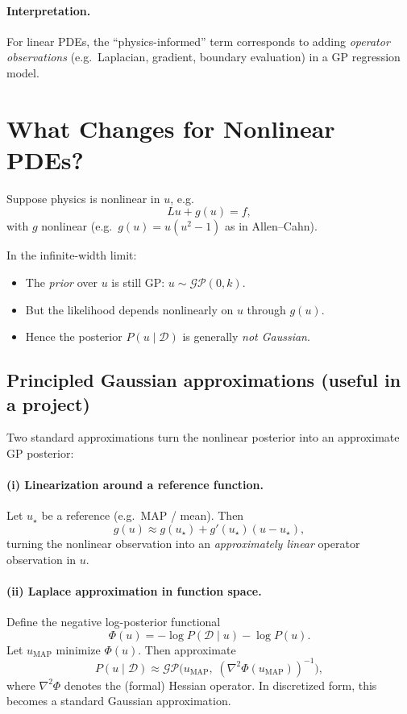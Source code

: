 \documentclass[11pt]{article}
\begin{document}
\paragraph{Interpretation.}
For linear PDEs, the ``physics-informed'' term corresponds to adding \emph{operator observations} (e.g.\ Laplacian,
gradient, boundary evaluation) in a GP regression model.

\section{What Changes for Nonlinear PDEs?}

Suppose physics is nonlinear in $u$, e.g.
\begin{equation}
Lu + g(u) = f,
\end{equation}
with $g$ nonlinear (e.g.\ $g(u)=u(u^2-1)$ as in Allen--Cahn).

In the infinite-width limit:
\begin{itemize}
\item The \emph{prior} over $u$ is still GP: $u\sim \mathcal{GP}(0,k)$.
\item But the likelihood depends nonlinearly on $u$ through $g(u)$.
\item Hence the posterior $P(u\mid \mathcal D)$ is generally \emph{not Gaussian}.
\end{itemize}

\subsection{Principled Gaussian approximations (useful in a project)}

Two standard approximations turn the nonlinear posterior into an approximate GP posterior:

\paragraph{(i) Linearization around a reference function.}
Let $u_\star$ be a reference (e.g.\ MAP / mean). Then
\begin{equation}
g(u)\approx g(u_\star) + g'(u_\star)(u-u_\star),
\end{equation}
turning the nonlinear observation into an \emph{approximately linear} operator observation in $u$.

\paragraph{(ii) Laplace approximation in function space.}
Define the negative log-posterior functional
\begin{equation}
\Phi(u) = -\log P(\mathcal D\mid u) - \log P(u).
\end{equation}
Let $u_{\text{MAP}}$ minimize $\Phi(u)$. Then approximate
\begin{equation}
P(u\mid \mathcal D) \approx \mathcal{GP}\Big(u_{\text{MAP}},\; (\nabla^2\Phi(u_{\text{MAP}}))^{-1}\Big),
\end{equation}
where $\nabla^2\Phi$ denotes the (formal) Hessian operator. In discretized form, this becomes a standard Gaussian approximation.
\end{document}
